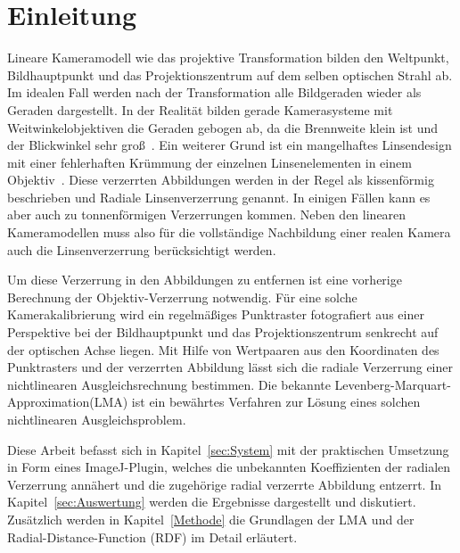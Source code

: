 \section{Einleitung}\label{sec:Introduction}

Lineare Kameramodell wie das projektive Transformation bilden den Weltpunkt, Bildhauptpunkt und das Projektionszentrum auf dem selben optischen Strahl ab. Im idealen Fall werden nach der Transformation alle Bildgeraden wieder als Geraden dargestellt. In der Realität bilden gerade Kamerasysteme mit Weitwinkelobjektiven die Geraden gebogen ab, da die Brennweite klein ist und der Blickwinkel sehr groß~\cite{HartleyRadDist}. Ein weiterer Grund ist ein mangelhaftes Linsendesign mit einer fehlerhaften Krümmung der einzelnen Linsenelementen in einem Objektiv~\cite{WengRadDist}\cite{Zhang:1996:EGT:844381.845228}. Diese verzerrten Abbildungen werden in der Regel als kissenförmig beschrieben und Radiale Linsenverzerrung genannt. In einigen Fällen kann es aber auch zu tonnenförmigen Verzerrungen kommen. Neben den linearen Kameramodellen muss also für die vollständige Nachbildung einer realen Kamera auch die Linsenverzerrung berücksichtigt werden. 

Um diese Verzerrung in den Abbildungen zu entfernen ist eine vorherige Berechnung der Objektiv-Verzerrung notwendig. Für eine solche Kamerakalibrierung wird ein regelmäßiges Punktraster fotografiert aus einer Perspektive bei der Bildhauptpunkt und das Projektionszentrum senkrecht auf der optischen Achse liegen. 
Mit Hilfe von Wertpaaren aus den Koordinaten des Punktrasters und der verzerrten Abbildung lässt sich die radiale Verzerrung einer nichtlinearen Ausgleichsrechnung bestimmen. Die bekannte Levenberg-Marquart-Approximation(LMA) ist ein bewährtes Verfahren zur Lösung eines solchen nichtlinearen Ausgleichsproblem.

Diese Arbeit befasst sich in Kapitel~\ref{sec:System} mit der praktischen Umsetzung in Form eines ImageJ-Plugin, welches die unbekannten Koeffizienten der radialen Verzerrung annähert und die zugehörige radial verzerrte Abbildung entzerrt. In Kapitel~\ref{sec:Auswertung} werden die Ergebnisse dargestellt und diskutiert. Zusätzlich werden in Kapitel~\ref{Methode} die Grundlagen der LMA und der Radial-Distance-Function (RDF) im Detail erläutert.
























